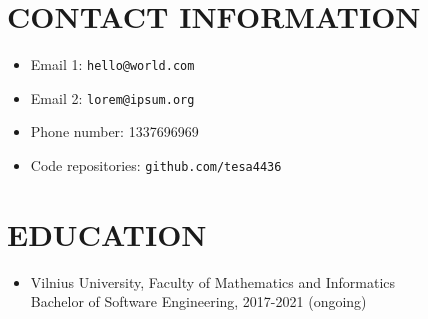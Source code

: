 \documentclass{res}
\begin{document}
 


\address{\texttt{github.com/tesa4436}}
                                  
\begin{resume}

\section{CONTACT INFORMATION}          
\begin{itemize}
	\item Email 1:			\texttt{hello@world.com}
	\item Email 2:			\texttt{lorem@ipsum.org}
	\item Phone number:		1337696969
	\item Code repositories:	\texttt{github.com/tesa4436}
\end{itemize}


\section{EDUCATION}          

\begin{itemize}
    \item Vilnius University, Faculty of Mathematics and Informatics\\        
    Bachelor of Software Engineering, 2017-2021 (ongoing)      
\end{itemize}
 

\end{resume}
\end{document}
